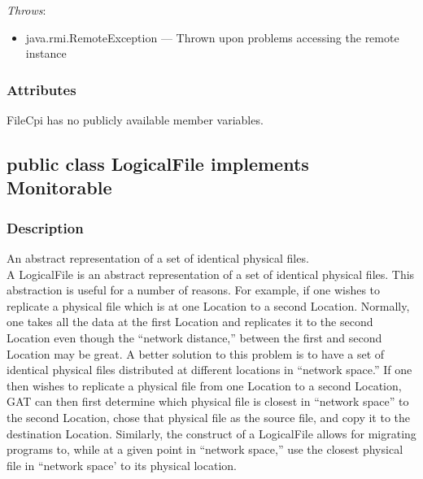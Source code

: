 \documentclass[$Date: 2003/06/26 19:29:31 $]{glabarticle}
\begin{document}
 \textit{Throws}:
 \begin{itemize}
 \item[] java.rmi.RemoteException --- Thrown upon problems accessing the remote instance 
 \end{itemize}
 

\subsubsection{Attributes}

FileCpi has no publicly available member variables. 


\newpage

\subsection{public class LogicalFile implements Monitorable}


\subsubsection{Description}

An abstract representation of a set of identical physical files. \\

A LogicalFile is an abstract representation of a set of identical
physical files. This abstraction is useful for a number of
reasons. For example, if one wishes to replicate a physical file which
is at one Location to a second Location. Normally, one takes all the
data at the first Location and replicates it to the second Location
even though the ``network distance,'' between the first and second
Location may be great. A better solution to this problem is to have a
set of identical physical files distributed at different locations in
``network space.'' If one then wishes to replicate a physical file
from one Location to a second Location, GAT can then first determine
which physical file is closest in ``network space'' to the second
Location, chose that physical file as the source file, and copy it to
the destination Location. Similarly, the construct of a LogicalFile
allows for migrating programs to, while at a given point in ``network
space,'' use the closest physical file in ``network space' to its
physical location.
\end{document}
